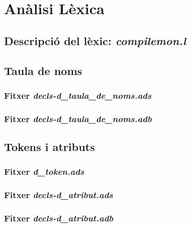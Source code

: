 \section{Anàlisi Lèxica}

\subsection{Descripció del lèxic: \emph{compilemon.l}}

\newpage

\subsection{Taula de noms}
\subsubsection{Fitxer \emph{decls-d\_taula\_de\_noms.ads}}

\newpage

\subsubsection{Fitxer \emph{decls-d\_taula\_de\_noms.adb}}

\newpage

\subsection{Tokens i atributs}
\subsubsection{Fitxer \emph{d\_token.ads}}

\newpage

\subsubsection{Fitxer \emph{decls-d\_atribut.ads}}

\newpage

\subsubsection{Fitxer \emph{decls-d\_atribut.adb}}

\newpage
